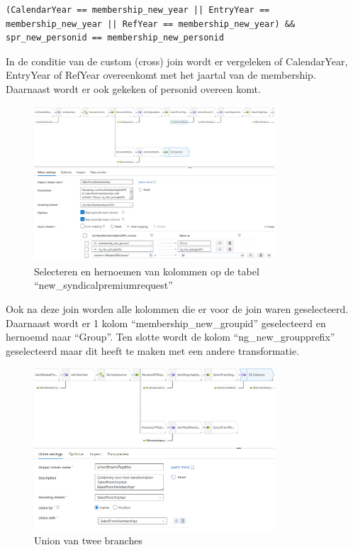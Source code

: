 \begin{verbatim}
(CalendarYear == membership_new_year || EntryYear == membership_new_year || RefYear == membership_new_year) && spr_new_personid == membership_new_personid
\end{verbatim}

In de conditie van de custom (cross) join wordt er vergeleken of CalendarYear, EntryYear of RefYear overeenkomt met het jaartal van de membership. Daarnaast wordt er ook gekeken of personid overeen komt.

\begin{figure}[H]
    \centering
    \includegraphics[width=0.8\textwidth]{./graphics/adf/bepalen_groep_8.png}
    \caption{Selecteren en hernoemen van kolommen op de tabel ``new\_syndicalpremiumrequest''}
    \label{fig:bepalengroep}
\end{figure}

Ook na deze join worden alle kolommen die er voor de join waren geselecteerd. Daarnaast wordt er 1 kolom ``membership\_new\_groupid'' geselecteerd en hernoemd naar ``Group''. Ten slotte wordt de kolom ``ng\_new\_groupprefix'' geselecteerd maar dit heeft te maken met een andere transformatie.

\begin{figure}[H]
    \centering
    \includegraphics[width=0.8\textwidth]{./graphics/adf/bepalen_groep_9.png}
    \caption{Union van twee branches}
\end{figure}

